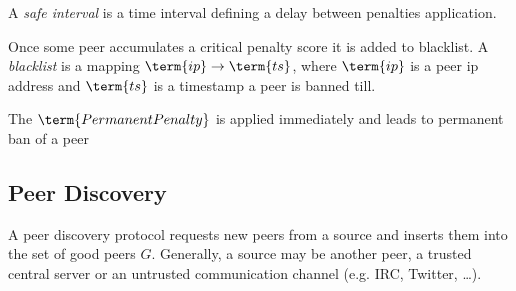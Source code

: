 A \emph{safe interval} is a time interval defining a delay between penalties application.

Once some peer accumulates a critical penalty score it is added to blacklist.
A \emph{blacklist} is a mapping $\term{ip} \rightarrow \term{ts}$, where $\term{ip}$ is a peer ip address
and $\term{ts}$ is a timestamp a peer is banned till.

The $\term{PermanentPenalty}$ is applied immediately and leads to permanent ban of a peer

\subsection{Peer Discovery}\label{subsec:peer-discovery}

A peer discovery protocol requests new peers from a source and inserts them into
the set of good peers $G$.
Generally, a source may be another peer, a trusted central server or an untrusted communication
channel (e.g. IRC, Twitter, \ldots).
